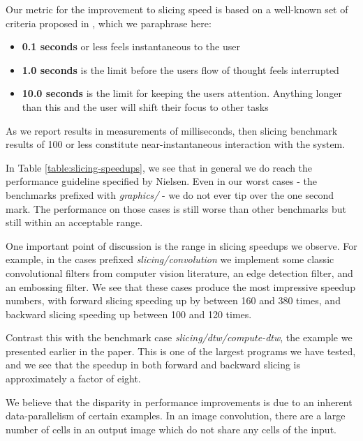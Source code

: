 
Our metric for the improvement to slicing speed is based on a well-known set of
criteria proposed in \cite{nielsen93}, which we paraphrase here:

\begin{itemize}
    \item \textbf{0.1 seconds} or less feels instantaneous to the user
    \item \textbf{1.0 seconds} is the limit before the users flow of thought feels
    interrupted
    \item \textbf{10.0 seconds} is the limit for keeping the users attention. Anything longer
    than this and the user will shift their focus to other tasks
\end{itemize}

As we report results in measurements of milliseconds, then slicing benchmark results
of 100 or less constitute near-instantaneous interaction with the system.

In Table \ref{table:slicing-speedups}, we see that in general we do reach
the performance guideline specified by Nielsen. Even in our worst cases - the
benchmarks prefixed with \textit{graphics/} - we do not ever tip over the one
second mark. The performance on those cases is still worse than other benchmarks
but still within an acceptable range.

One important point of discussion is the range in slicing speedups we observe.
For example, in the cases prefixed \textit{slicing/convolution} we implement
some classic convolutional filters from computer vision literature, an edge
detection filter, and an embossing filter. We see that these cases produce the
most impressive speedup numbers, with forward slicing speeding up by between
160 and 380 times, and backward slicing speeding up between 100 and 120 times.

Contrast this with the benchmark case \textit{slicing/dtw/compute-dtw}, the
example we presented earlier in the paper. This is one of the largest programs
we have tested, and we see that the speedup in both forward and backward slicing
is approximately a factor of eight.

We believe that the disparity in performance improvements is due to an inherent
data-parallelism of certain examples. In an image convolution, there are a large
number of cells in an output image which do not share any cells of the input.

